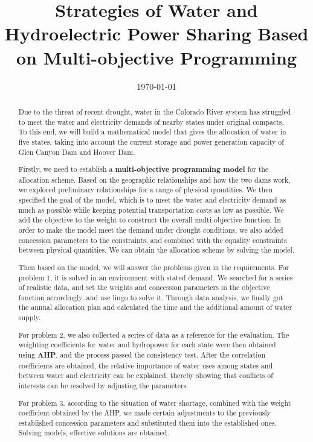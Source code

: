 \documentclass{mcmthesis}
\title{\large Strategies of Water and Hydroelectric Power Sharing Based on Multi-objective Programming}
\author{ }
\date{\today}
\begin{document}
\begin{abstract}
	
Due to the threat of recent drought, water in the Colorado River system has struggled to meet the water and electricity demands of nearby states under original compacts. To this end, we will build a mathematical model that gives the allocation of water in five states, taking into account the current storage and power generation capacity of Glen Canyon Dam and Hoover Dam.

Firstly, we need to establish a \textbf{multi-objective programming model} for the allocation scheme. Based on the geographic relationships and how the two dams work, we explored preliminary relationships for a range of physical quantities. We then specified the goal of the model, which is to meet the water and electricity demand as much as possible while keeping potential transportation costs as low as possible. We add the objective to the weight to construct the overall multi-objective function. In order to make the model meet the demand under drought conditions, we also added concession parameters to the constraints, and combined with the equality constraints between physical quantities. We can obtain the allocation scheme by solving the model. 

Then based on the model, we will answer the problems given in the requirements. For problem 1, it is solved in an environment with stated demand. We searched for a series of realistic data, and set the weights and concession parameters in the objective function accordingly, and use lingo to solve it. Through data analysis, we finally got the annual allocation plan and calculated the time and the additional amount of water supply. 

For problem 2, we also collected a series of data as a reference for the evaluation. The weighting coefficients for water and hydropower for each state were then obtained using \textbf{AHP}, and the process passed the consistency test. After the correlation coefficients are obtained, the relative importance of water uses among states and between water and electricity can be explained, thereby showing that conflicts of interests can be resolved by adjusting the parameters. 

For problem 3, according to the situation of water shortage, combined with the weight coefficient obtained by the AHP, we made certain adjustments to the previously established concession parameters and substituted them into the established ones. Solving models, effective solutions are obtained.
 

\end{abstract}
\end{document}
